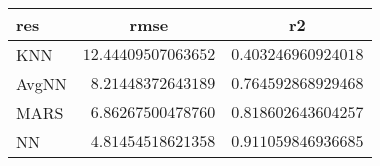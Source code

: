 \begin{table}[!tbp]
\begin{center}
\begin{tabular}{lrr}
\hline\hline
\multicolumn{1}{l}{res}&\multicolumn{1}{c}{rmse}&\multicolumn{1}{c}{r2}\tabularnewline
\hline
KNN&$12.44409507063652$&$0.403246960924018$\tabularnewline
AvgNN&$ 8.21448372643189$&$0.764592868929468$\tabularnewline
MARS&$ 6.86267500478760$&$0.818602643604257$\tabularnewline
NN&$ 4.81454518621358$&$0.911059846936685$\tabularnewline
\hline
\end{tabular}\end{center}

\end{table}
